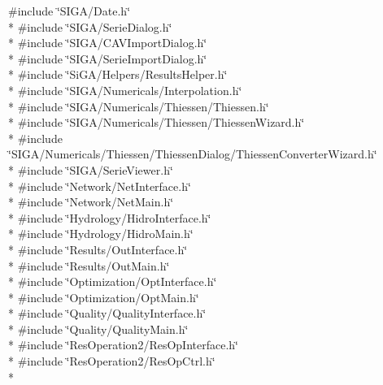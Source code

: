 {\ttfamily \#include \char`\"{}S\+I\+G\+A/\+Date.\+h\char`\"{}}\\*
{\ttfamily \#include \char`\"{}S\+I\+G\+A/\+Serie\+Dialog.\+h\char`\"{}}\\*
{\ttfamily \#include \char`\"{}S\+I\+G\+A/\+C\+A\+V\+Import\+Dialog.\+h\char`\"{}}\\*
{\ttfamily \#include \char`\"{}S\+I\+G\+A/\+Serie\+Import\+Dialog.\+h\char`\"{}}\\*
{\ttfamily \#include \char`\"{}Si\+G\+A/\+Helpers/\+Results\+Helper.\+h\char`\"{}}\\*
{\ttfamily \#include \char`\"{}S\+I\+G\+A/\+Numericals/\+Interpolation.\+h\char`\"{}}\\*
{\ttfamily \#include \char`\"{}S\+I\+G\+A/\+Numericals/\+Thiessen/\+Thiessen.\+h\char`\"{}}\\*
{\ttfamily \#include \char`\"{}S\+I\+G\+A/\+Numericals/\+Thiessen/\+Thiessen\+Wizard.\+h\char`\"{}}\\*
{\ttfamily \#include \char`\"{}S\+I\+G\+A/\+Numericals/\+Thiessen/\+Thiessen\+Dialog/\+Thiessen\+Converter\+Wizard.\+h\char`\"{}}\\*
{\ttfamily \#include \char`\"{}S\+I\+G\+A/\+Serie\+Viewer.\+h\char`\"{}}\\*
{\ttfamily \#include \char`\"{}Network/\+Net\+Interface.\+h\char`\"{}}\\*
{\ttfamily \#include \char`\"{}Network/\+Net\+Main.\+h\char`\"{}}\\*
{\ttfamily \#include \char`\"{}Hydrology/\+Hidro\+Interface.\+h\char`\"{}}\\*
{\ttfamily \#include \char`\"{}Hydrology/\+Hidro\+Main.\+h\char`\"{}}\\*
{\ttfamily \#include \char`\"{}Results/\+Out\+Interface.\+h\char`\"{}}\\*
{\ttfamily \#include \char`\"{}Results/\+Out\+Main.\+h\char`\"{}}\\*
{\ttfamily \#include \char`\"{}Optimization/\+Opt\+Interface.\+h\char`\"{}}\\*
{\ttfamily \#include \char`\"{}Optimization/\+Opt\+Main.\+h\char`\"{}}\\*
{\ttfamily \#include \char`\"{}Quality/\+Quality\+Interface.\+h\char`\"{}}\\*
{\ttfamily \#include \char`\"{}Quality/\+Quality\+Main.\+h\char`\"{}}\\*
{\ttfamily \#include \char`\"{}Res\+Operation2/\+Res\+Op\+Interface.\+h\char`\"{}}\\*
{\ttfamily \#include \char`\"{}Res\+Operation2/\+Res\+Op\+Ctrl.\+h\char`\"{}}\\*
